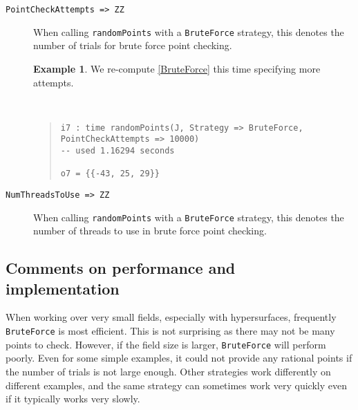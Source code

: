\documentclass[11pt]{amsart}
\theoremstyle{definition}
\newtheorem{example}{Example}[section]
\begin{document}
\begin{description}
    \item[\tt PointCheckAttempts => ZZ]

    When calling {\tt randomPoints} with a {\tt BruteForce} strategy, this denotes the number of trials for brute force point checking.
    
    \begin{example}
        We re-compute \cref{BruteForce} this time specifying more attempts.
    {{\small\color{blue}
    ~~
    \begin{quote}
\begin{verbatim}    
i7 : time randomPoints(J, Strategy => BruteForce, PointCheckAttempts => 10000)
-- used 1.16294 seconds

o7 = {{-43, 25, 29}}
    \end{verbatim}%
\end{quote}\vspace{-1em}%
}}%
    \end{example}%
    
    \item[\tt NumThreadsToUse => ZZ]

    When calling {\tt randomPoints} with a {\tt BruteForce} strategy, this denotes the number of threads to use in brute force point checking.
    \end{description}

    \subsection{Comments on performance and implementation}
    \label{subsec.CommentOnPerformanceAndImplementation}

    When working over very small fields, especially with hypersurfaces, frequently {\tt BruteForce} is most efficient.  This is not surprising as there may not be many points to check.  However, if the field size is larger, {\tt BruteForce} will perform poorly.  Even for some simple examples, it could not provide any rational points if the number of trials is not large enough.  Other strategies work differently on different examples, and the same strategy can sometimes work very quickly even if it typically works very slowly.  
\end{document}
